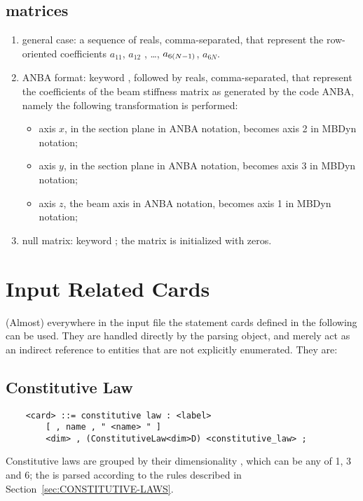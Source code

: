\subsection{ matrices}
\begin{enumerate}
    \item general case: a sequence of  reals, comma-separated, that
    represent the row-oriented coefficients $ a_{11} $, $ a_{12}$ ,
    \ldots, $ a_{6\left( N-1 \right)} $, $ a_{6N} $.
    \item ANBA format: keyword , followed by  reals,
    comma-separated, that represent the coefficients of the beam stiffness
    matrix as generated by the code ANBA, namely the following
    transformation is performed:
    \begin{itemize}
        \item axis $ x $, in the section plane in ANBA notation, 
	becomes axis 2 in MBDyn notation;    
	\item axis $ y $, in the section plane in ANBA notation, 
	becomes axis 3 in MBDyn notation;    
	\item axis $ z $, the beam axis in ANBA notation, 
	becomes axis 1 in MBDyn notation;    
    \end{itemize}
    \item null matrix: keyword ; the matrix is initialized 
    with zeros.
\end{enumerate}


\section{Input Related Cards} 
(Almost) everywhere in the input file the statement cards defined 
in the following can be used.
They are handled directly by the parsing object, and merely act as
an indirect reference to entities that are not explicitly enumerated.
They are:



\subsection{Constitutive Law}\label{sec:CONSTITUTIVE-LAW}
\begin{verbatim}
    <card> ::= constitutive law : <label>
        [ , name , " <name> " ]
        <dim> , (ConstitutiveLaw<dim>D) <constitutive_law> ;
\end{verbatim}
Constitutive laws are grouped by their dimensionality ,
which can be any of 1, 3 and 6; the 
is parsed according to the rules described
in Section~\ref{sec:CONSTITUTIVE-LAWS}.



